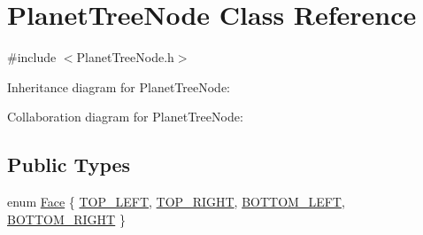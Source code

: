 \hypertarget{class_planet_tree_node}{\section{Planet\+Tree\+Node Class Reference}
\label{class_planet_tree_node}
}


{\ttfamily \#include $<$Planet\+Tree\+Node.\+h$>$}



Inheritance diagram for Planet\+Tree\+Node\+:


Collaboration diagram for Planet\+Tree\+Node\+:
\subsection*{Public Types}
\begin{DoxyCompactItemize}
\item 
enum \hyperlink{class_planet_tree_node_a6083412108802a50ff0ef1fd7806006c}{Face} \{ \hyperlink{class_planet_tree_node_a6083412108802a50ff0ef1fd7806006cacd8fb9f35d21bd0306526d2d7ce9f305}{T\+O\+P\+\_\+\+L\+E\+F\+T}, 
\hyperlink{class_planet_tree_node_a6083412108802a50ff0ef1fd7806006caf267b6582de2e842c8a8c43ef073b05c}{T\+O\+P\+\_\+\+R\+I\+G\+H\+T}, 
\hyperlink{class_planet_tree_node_a6083412108802a50ff0ef1fd7806006ca59295adcd412488cd24833ea86231d52}{B\+O\+T\+T\+O\+M\+\_\+\+L\+E\+F\+T}, 
\hyperlink{class_planet_tree_node_a6083412108802a50ff0ef1fd7806006ca8fe618ad036bb0edb8bf357e138c851a}{B\+O\+T\+T\+O\+M\+\_\+\+R\+I\+G\+H\+T}
 \}
\end{DoxyCompactItemize}
